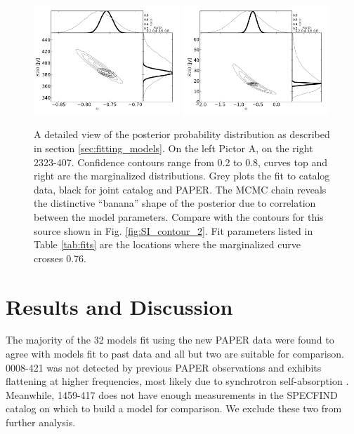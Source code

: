 \documentclass[preprint]{aastex}
\newcommand{\Nsrc}{32}
\begin{document}
\begin{figure}[htbp]
\includegraphics[width=0.49\textwidth]{plots/pic_trace_hist.png}
\includegraphics[width=0.49\textwidth]{plots/2323-407_trace_hist.png}
\caption{
A detailed view of the posterior probability distribution as described in section \ref{sec:fitting_models}. On the left
Pictor A, on the right 2323-407. Confidence contours range from 0.2 to 0.8, curves top and right 
are the marginalized distributions. Grey plots the fit to catalog data, black for joint catalog and PAPER.
 The MCMC
chain reveals the distinctive ``banana'' shape of the posterior
due to correlation between the model parameters.
Compare with the contours for this source shown in Fig. \ref{fig:SI_contour_2}. Fit parameters listed in
Table \ref{tab:fits} are the locations where the marginalized curve crosses 0.76.
\label{fig:posteriors}
}
\end{figure}




\section{Results and Discussion}
\label{sec:results}
The majority of the \Nsrc{} models fit using the new PAPER data were found to agree with
models fit to past data and all but two are suitable for comparison.  
0008-421 was not detected by previous PAPER observations and
exhibits flattening at higher frequencies, most likely due to synchrotron
self-absorption \citep{Jacobs:2011p8438}. Meanwhile, 1459-417 does not have enough 
measurements in the SPECFIND catalog on which to build a model for comparison. We exclude these 
two from further analysis.
\end{document}
